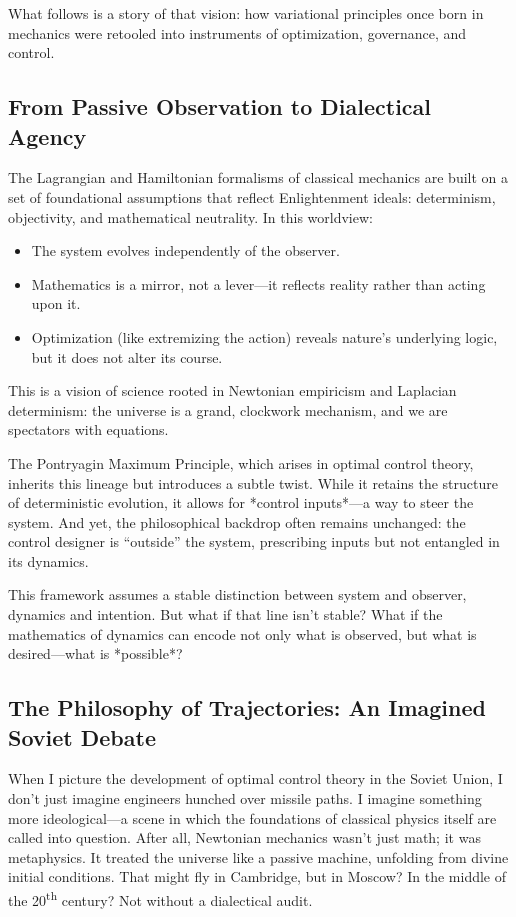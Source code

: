 What follows is a story of that vision: how variational principles once born in mechanics were retooled into instruments of optimization, governance, and control.

\subsection{From Passive Observation to Dialectical Agency}

The Lagrangian and Hamiltonian formalisms of classical mechanics are built on a set of foundational assumptions that reflect Enlightenment ideals: determinism, objectivity, and mathematical neutrality. In this worldview:

\begin{itemize}
	\item The system evolves independently of the observer.  
	\item Mathematics is a mirror, not a lever—it reflects reality rather than acting upon it.  
	\item Optimization (like extremizing the action) reveals nature’s underlying logic, but it does not alter its course.
\end{itemize}

This is a vision of science rooted in Newtonian empiricism and Laplacian determinism: the universe is a grand, clockwork mechanism, and we are spectators with equations.

The Pontryagin Maximum Principle, which arises in optimal control theory, inherits this lineage but introduces a subtle twist. While it retains the structure of deterministic evolution, it allows for *control inputs*—a way to steer the system. And yet, the philosophical backdrop often remains unchanged: the control designer is “outside” the system, prescribing inputs but not entangled in its dynamics.

This framework assumes a stable distinction between system and observer, dynamics and intention. But what if that line isn't stable? What if the mathematics of dynamics can encode not only what is observed, but what is desired—what is *possible*?

\subsection{The Philosophy of Trajectories: An Imagined Soviet Debate}

When I picture the development of optimal control theory in the Soviet Union, I don’t just imagine engineers hunched over missile paths. I imagine something more ideological—a scene in which the foundations of classical physics itself are called into question. After all, Newtonian mechanics wasn’t just math; it was metaphysics. It treated the universe like a passive machine, unfolding from divine initial conditions. That might fly in Cambridge, but in Moscow? In the middle of the 20\textsuperscript{th} century? Not without a dialectical audit.

